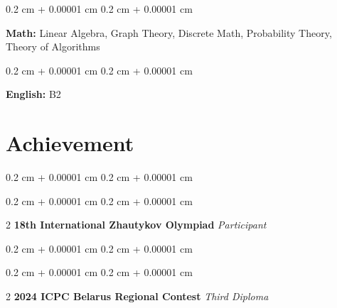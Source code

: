 \documentclass[10pt, letterpaper]{article}
\newenvironment{highlights}{
    \begin{itemize}[
        topsep=0.10 cm,
        parsep=0.10 cm,
        partopsep=0pt,
        itemsep=0pt,
        leftmargin=0.4 cm + 10pt
    ]
}{
    \end{itemize}
}
\newenvironment{onecolentry}{
    \begin{adjustwidth}{
        0.2 cm + 0.00001 cm
    }{
        0.2 cm + 0.00001 cm
    }
}{
    \end{adjustwidth}
}
\newenvironment{twocolentry}[2][]{
    \onecolentry
    \def\secondColumn{#2}
    \setcolumnwidth{\fill, 4.5 cm}
    \begin{paracol}{2}
}{
    \switchcolumn \raggedleft \secondColumn
    \end{paracol}
    \endonecolentry
}
\begin{document}
\begin{onecolentry}
    \textbf{Math:} Linear Algebra, Graph Theory, Discrete Math, Probability Theory, Theory of Algorithms
\end{onecolentry}

\vspace{0.2cm}

\begin{onecolentry}
    \textbf{English:} B2
\end{onecolentry}

\vspace{0.2cm}

\section{Achievement}{


\vspace{0.10cm}

\begin{onecolentry} \begin{highlights} \begin{twocolentry}{\textit{Participant}} \textbf{18th International Zhautykov Olympiad} \end{twocolentry} \end{highlights} \end{onecolentry}

\vspace{0.10cm}

\begin{onecolentry} \begin{highlights} \begin{twocolentry}{\textit{Third Diploma}} \textbf{2024 ICPC Belarus Regional Contest} \end{twocolentry} \end{highlights} \end{onecolentry}
\end{document}
